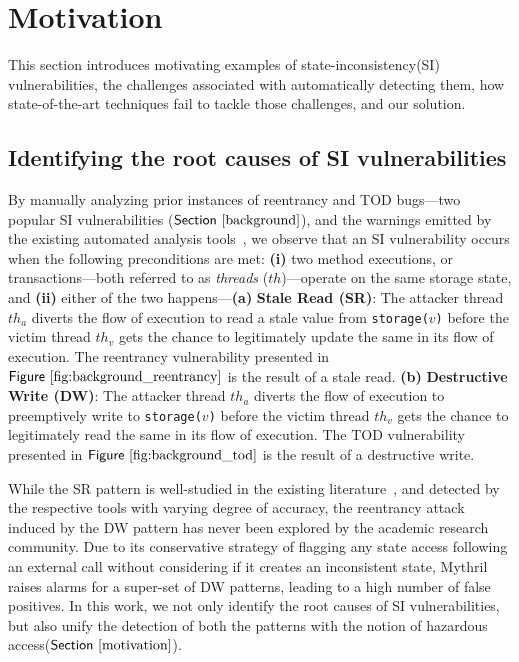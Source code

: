 \documentclass[conference, romanappendices]{tex/IEEEtran}
\theoremstyle{bfnote}
\newcommand{\reentrancy}{{reentrancy}\xspace}
\newcommand{\haz}{{hazardous access}\xspace}
\newcommand{\si}{{state-inconsistency}\xspace}
\newcommand{\mythril}{{\sc Mythril}\xspace}
\newcommand{\Fig}[1]{\ensuremath{\sf Figure~\ref{#1}}}
\newcommand{\Sect}[1]{\ensuremath{\sf Section~\ref{#1}}}
\begin{document}
 	\vspace{2mm}
\section{Motivation} 
\label{motivation}
This section introduces motivating examples of \si (SI) vulnerabilities, 
the challenges associated with automatically detecting them, how state-of-the-art techniques fail to tackle those challenges, and our solution.


\subsection{\textbf{Identifying the root causes of SI vulnerabilities}}
By manually analyzing prior instances of \reentrancy and {TOD\EndAccSupp{}} bugs---two popular SI vulnerabilities (\Sect{background}), and the warnings emitted by the existing automated analysis tools~\cite{sereum, mythril, securify, oyente}, we observe that an SI vulnerability occurs when the following preconditions are met:
\textbf{(i)} two method executions, or transactions---both referred to as \textit{threads} ($th$)---operate on the same storage state, and 
\textbf{(ii)} either of the two happens---\textbf{(a)} \textbf{Stale Read (SR)}: 
The attacker thread $th_a$ diverts the flow of execution to read a {stale\EndAccSupp{}} value from \texttt{storage($v$)} before the victim thread $th_v$ gets the chance to legitimately update the same in its flow of execution.
The \reentrancy vulnerability presented in \Fig{fig:background_reentrancy} is the result of a {stale\EndAccSupp{}} read.
\textbf{(b)} \textbf{Destructive Write (DW)}: 
The attacker thread $th_a$ diverts the flow of execution to preemptively write to \texttt{storage($v$)} before the victim thread $th_v$ gets the chance to legitimately read the same in its flow of execution.
The {TOD\EndAccSupp{}} vulnerability presented in \Fig{fig:background_tod} is the result of a {destructive\EndAccSupp{}} write.

While the SR pattern is well-studied in the existing literature~\cite{securify,sereum,oyente,vandal}, and detected by the respective tools with varying degree of accuracy, the \reentrancy attack induced by the DW pattern 
has never been explored by the academic research community.
Due to its conservative strategy of flagging any state access following an external call without considering if it creates an inconsistent state, \mythril raises alarms for a super-set of DW patterns, leading to a high number of false positives.
In this work, we not only identify the root causes of SI vulnerabilities, but also unify the detection of both the patterns with the notion of \haz (\Sect{motivation}).
\end{document}
